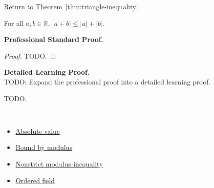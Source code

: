 \newpage
{}
\label{prf:triangle-inequality}

\begin{remark*}[Return]
\hyperref[thm:triangle-inequality]{Return to Theorem~\ref*{thm:triangle-inequality}.}
\end{remark*}

\begin{theorem*}
For all $a, b \in \mathbb{R}$,
$\lvert a + b \rvert \le \lvert a \rvert + \lvert b \rvert$.
\end{theorem*}

\textbf{Professional Standard Proof.}~\\
\begin{proof}
TODO.
\end{proof}

\textbf{Detailed Learning Proof.}~\\
TODO: Expand the professional proof into a detailed learning proof.


\begin{remark*}
TODO.
\end{remark*}

\begin{remark*}[Dependencies]~\\
\begin{itemize}
  \item \hyperref[def:absolute-value]{Absolute value}
  \item \hyperref[thm:absolute-value-bounds]{Bound by modulus}
  \item \hyperref[thm:absolute-value-le-iff]{Nonstrict modulus inequality}
  \item \hyperref[def:ordered-field]{Ordered field}
\end{itemize}
\end{remark*}
